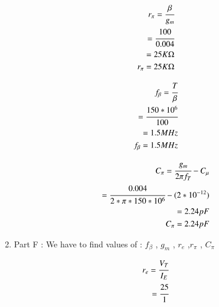 \begin{enumerate}[label=\thesubsection.\arabic*.,ref=\thesubsection.\theenumi]
\begin{align}
\end{align}
 
\begin{align}

        r_{\pi} = \cfrac{\beta}{g_{m}}\\
                
                = \cfrac{100}{0.004}\\
                
                = 25 K\ohm\\
            
        r_{\pi} = 25 K\ohm
    
\end{align}    

\begin{align} 

        f_{\beta} = \cfrac{{T}}{\beta} \\
                  
                  = \cfrac{150*{10^6}}{100} \\
                  
                  = 1.5 MHz \\
        
       f_{\beta} = 1.5 MHz
\end{align}

\begin{align}

         C_{\pi} = \cfrac{g_{m}}{2\pi f_{T}}- C_{\mu}\\
                 
                 = \cfrac{0.004}{2*\pi*150*{10^6}}- (2*{10^{-12}}) \\
              
                 = 2.24 pF \\
    
          C_{\pi} = 2.24 pF 

\end{align}


\item
Part F : We have to find values of :
 $f_{\beta}$ , $g_{m}$ , $r_{e}$ ,$r_{\pi}$ , $C_{\pi}$ \\
  
 \solution

\begin{align}

        r_{e} = \cfrac{V_{T}}{I_{E}}\\
              
              = \cfrac{25}{1}\\
              

\end{align}
\end{enumerate}
